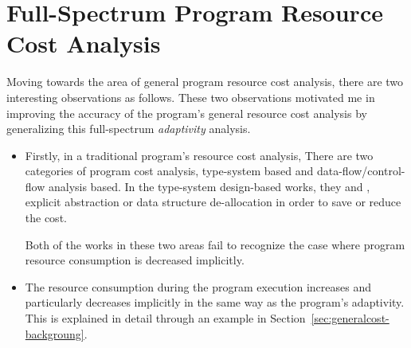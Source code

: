 \section{Full-Spectrum Program Resource Cost Analysis}
\label{sec:intro-cost}
Moving towards the area of general program resource cost analysis,
there are two interesting observations as follows.
These two observations motivated me in 
improving the accuracy of the program's general resource cost analysis
by generalizing this full-spectrum \emph{adaptivity} analysis.
\begin{itemize}
 \item Firstly, in a traditional program's resource cost analysis,
 There are two categories of program cost analysis, type-system based and data-flow/control-flow analysis based. 
 In the type-system design-based works, they \cite{GustafssonEL05} and \cite{hoffmann_jost_2022}, explicit abstraction or data structure de-allocation in order to save or reduce the cost.
 
 Both of the
 works in these two areas fail to recognize the case where program resource consumption is decreased implicitly.
 \item The resource consumption during the program 
 execution increases and particularly decreases implicitly in the same way as the program's adaptivity. 
 This is explained in detail through an example in Section~\ref*{sec:generalcost-backgroung}.
\end{itemize}

